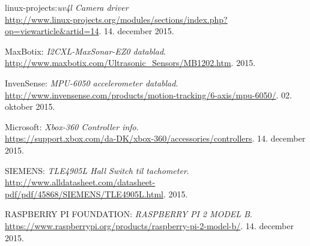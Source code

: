 \begin{thebibliography}{2}
 linux-projects:\textit{uv4l Camera driver} \\
\url{http://www.linux-projects.org/modules/sections/index.php?op=viewarticle&artid=14}. 14. december 2015.

 MaxBotix: \textit{I2CXL-MaxSonar-EZ0 datablad}. \\
\url{http://www.maxbotix.com/Ultrasonic_Sensors/MB1202.htm}. 2015.

 InvenSense: \textit{MPU-6050 accelerometer datablad}. \\
\url{http://www.invensense.com/products/motion-tracking/6-axis/mpu-6050/}. 02. oktober 2015.

 Microsoft: \textit{Xbox-360 Controller info}. \\
\url{https://support.xbox.com/da-DK/xbox-360/accessories/controllers}. 14. december 2015.

 SIEMENS: \textit{TLE4905L Hall Switch til tachometer}. \\
\url{http://www.alldatasheet.com/datasheet-pdf/pdf/45868/SIEMENS/TLE4905L.html}. 2015.

 RASPBERRY PI FOUNDATION: \textit{RASPBERRY PI 2 MODEL B}. \\
\url{https://www.raspberrypi.org/products/raspberry-pi-2-model-b/}. 14. december 2015.

\end{thebibliography}